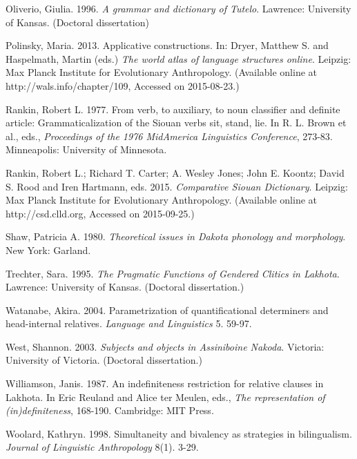 \begin{refsection}
\begin{reflist}
Oliverio, Giulia. 1996. \textit{A grammar and dictionary of Tutelo}. Lawrence: University of Kansas. (Doctoral dissertation)

Polinsky, Maria. 2013. Applicative constructions. In: Dryer, Matthew S. and Haspelmath, Martin (eds.) \textit{The world atlas of language structures online}. Leipzig: Max Planck Institute for Evolutionary Anthropology. (Available online at http://wals.info/chapter/109, Accessed on 2015-08-23.)

Rankin, Robert L. 1977. From verb, to auxiliary, to noun classifier and definite article: Grammaticalization of the Siouan verbs sit, stand, lie. In R. L. Brown et al., eds., \textit{Proceedings of the 1976 MidAmerica Linguistics Conference}, 273-83. Minneapolis: University of Minnesota.  

Rankin, Robert L.; Richard T. Carter; A. Wesley Jones; John E. Koontz; David S. Rood and Iren Hartmann, eds. 2015. \textit{Comparative Siouan Dictionary}. Leipzig: Max Planck Institute for Evolutionary Anthropology. (Available online at http://csd.clld.org, Accessed on 2015-09-25.) 

Shaw, Patricia A. 1980. \textit{Theoretical issues in Dakota phonology and morphology}. New York: Garland.

Trechter, Sara. 1995. \textit{The Pragmatic Functions of Gendered Clitics in Lakhota}. Lawrence: University of Kansas. (Doctoral dissertation.) 

Watanabe, Akira. 2004. Parametrization of quantificational determiners and head-internal relatives. \textit{Language and Linguistics} 5. 59-97.

West, Shannon. 2003. \textit{Subjects and objects in Assiniboine Nakoda}. Victoria: University of Victoria. (Doctoral dissertation.)

Williamson, Janis. 1987. An indefiniteness restriction for relative clauses in Lakhota. In Eric Reuland and Alice ter Meulen, eds., \textit{The representation of (in)definiteness}, 168-190. Cambridge: MIT Press. 

Woolard, Kathryn. 1998. Simultaneity and bivalency as strategies in bilingualism. \textit{Journal of Linguistic Anthropology} 8(1). 3-29.


\end{reflist}

%

\end{refsection}

